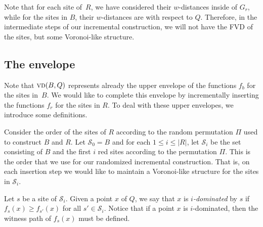 \documentclass[a4paper,UKenglish]{socg-lipics-v2018}
\newcommand{\idom}[1][i]{${#1}$-dominated\xspace}
\newcommand{\s}{\mathcal S}
\newcommand{\vd}[2][P]{\textsc{vd}(#2, #1)}
\begin{document}

Note that for each site of~$R$, we have considered their $w$-distances inside of $G_r$, while for the sites in $B$, their $w$-distances are with respect to $Q$.
Therefore, in the intermediate steps of our incremental construction, we will not have the FVD of the sites, but some Voronoi-like structure.



\subsection{The envelope}
Note that $\vd[Q]{B}$ represents already the upper envelope of the functions $f_b$ for the sites in~$B$. 
We would like to complete this envelope by incrementally inserting the functions $f_r$ for the sites in $R$.
To deal with these upper envelopes, we introduce some definitions.




Consider the order of the sites of $R$ according to the random permutation $\Pi$ used to construct $B$ and $R$.
Let $\s_0 = B$ and for each $1\leq i\leq |R|$, let $\s_i$ be the set consisting of $B$ and the first $i$ red sites according to the permutation $\Pi$.
This is the order that we use for our randomized incremental construction. 
That is, on each insertion step we would like to maintain a Voronoi-like structure for the sites in $\s_i$.

Let $s$ be a site of $\s_i$.
Given a point $x$ of $Q$, we say that $x$ is \emph{\idom} by $s$ if $f_s(x) \geq f_{s'}(x)$ for all $s'\in \s_i$.
Notice that if a point $x$ is \idom, then the witness path of $f_s(x)$ must be defined. 
\end{document}
